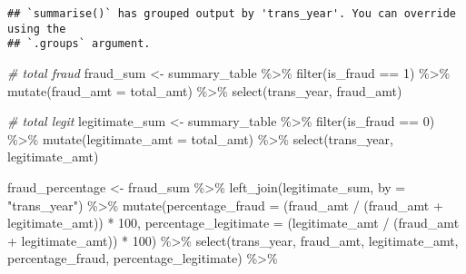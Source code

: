 \documentclass[
]{article}
\newenvironment{Shaded}{\begin{snugshade}}{\end{snugshade}}
\newcommand{\AttributeTok}[1]{\textcolor[rgb]{0.77,0.63,0.00}{#1}}
\newcommand{\CommentTok}[1]{\textcolor[rgb]{0.56,0.35,0.01}{\textit{#1}}}
\newcommand{\DecValTok}[1]{\textcolor[rgb]{0.00,0.00,0.81}{#1}}
\newcommand{\FunctionTok}[1]{\textcolor[rgb]{0.00,0.00,0.00}{#1}}
\newcommand{\NormalTok}[1]{#1}
\newcommand{\OtherTok}[1]{\textcolor[rgb]{0.56,0.35,0.01}{#1}}
\newcommand{\SpecialCharTok}[1]{\textcolor[rgb]{0.00,0.00,0.00}{#1}}
\newcommand{\StringTok}[1]{\textcolor[rgb]{0.31,0.60,0.02}{#1}}
\begin{document}
\begin{verbatim}
## `summarise()` has grouped output by 'trans_year'. You can override using the
## `.groups` argument.
\end{verbatim}

\begin{Shaded}
\begin{Highlighting}[]
\CommentTok{\# total fraud}
\NormalTok{fraud\_sum }\OtherTok{\textless{}{-}}\NormalTok{ summary\_table }\SpecialCharTok{\%\textgreater{}\%}
  \FunctionTok{filter}\NormalTok{(is\_fraud }\SpecialCharTok{==} \DecValTok{1}\NormalTok{) }\SpecialCharTok{\%\textgreater{}\%}
  \FunctionTok{mutate}\NormalTok{(}\AttributeTok{fraud\_amt =}\NormalTok{ total\_amt) }\SpecialCharTok{\%\textgreater{}\%}
  \FunctionTok{select}\NormalTok{(trans\_year, fraud\_amt)}

\CommentTok{\# total legit}
\NormalTok{legitimate\_sum }\OtherTok{\textless{}{-}}\NormalTok{ summary\_table }\SpecialCharTok{\%\textgreater{}\%}
  \FunctionTok{filter}\NormalTok{(is\_fraud }\SpecialCharTok{==} \DecValTok{0}\NormalTok{) }\SpecialCharTok{\%\textgreater{}\%}
  \FunctionTok{mutate}\NormalTok{(}\AttributeTok{legitimate\_amt =}\NormalTok{ total\_amt) }\SpecialCharTok{\%\textgreater{}\%}
  \FunctionTok{select}\NormalTok{(trans\_year, legitimate\_amt)}
  
\NormalTok{fraud\_percentage }\OtherTok{\textless{}{-}}\NormalTok{ fraud\_sum }\SpecialCharTok{\%\textgreater{}\%}
  \FunctionTok{left\_join}\NormalTok{(legitimate\_sum, }\AttributeTok{by =} \StringTok{"trans\_year"}\NormalTok{) }\SpecialCharTok{\%\textgreater{}\%}
  \FunctionTok{mutate}\NormalTok{(}\AttributeTok{percentage\_fraud =}\NormalTok{ (fraud\_amt }\SpecialCharTok{/}\NormalTok{ (fraud\_amt }\SpecialCharTok{+}\NormalTok{ legitimate\_amt)) }\SpecialCharTok{*} \DecValTok{100}\NormalTok{, }\AttributeTok{percentage\_legitimate =}\NormalTok{ (legitimate\_amt }\SpecialCharTok{/}\NormalTok{ (fraud\_amt }\SpecialCharTok{+}\NormalTok{ legitimate\_amt)) }\SpecialCharTok{*} \DecValTok{100}\NormalTok{) }\SpecialCharTok{\%\textgreater{}\%}
  \FunctionTok{select}\NormalTok{(trans\_year, fraud\_amt, legitimate\_amt, percentage\_fraud, percentage\_legitimate) }\SpecialCharTok{\%\textgreater{}\%} 
  

\end{Highlighting}
\end{Shaded}
\end{document}
